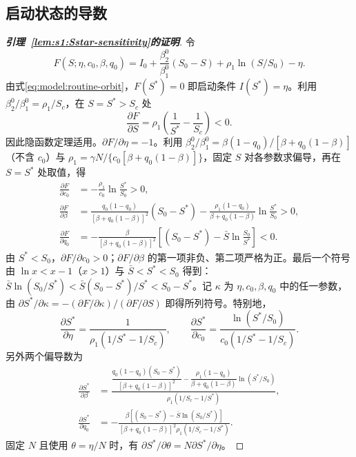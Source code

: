 \subsection{启动状态的导数}
\label{sec:proof:start-sensitivity}
\begin{proof}[\normalfont\bfseries 引理~\ref{lem:s1:Sstar-sensitivity}的证明]
令
\[
F(S;\eta,c_0,\beta,q_0)
=I_0+\frac{\beta_2^0}{\beta_1^0}(S_0-S)+\rho_1\ln(S/S_0)-\eta.
\]
由式\eqref{eq:model:routine-orbit}，$F(S^*)=0$ 即启动条件 $I(S^*)=\eta$。利用 $\beta_2^0/\beta_1^0=\rho_1/S_c$，在 $S=S^*>S_c$ 处
\[
\frac{\partial F}{\partial S}=\rho_1\left(\frac1{S^*}-\frac1{S_c}\right)<0.
\]
因此隐函数定理适用。$\partial F/\partial\eta=-1$。利用 $\beta_2^0/\beta_1^0=\beta(1-q_0)/[\beta+q_0(1-\beta)]$（不含 $c_0$）与 $\rho_1=\gamma N/\{c_0[\beta+q_0(1-\beta)]\}$，固定 $S$ 对各参数求偏导，再在 $S=S^*$ 处取值，得
\begin{align*}
\frac{\partial F}{\partial c_0}
&=-\frac{\rho_1}{c_0}\ln\frac{S^*}{S_0}>0,\\
\frac{\partial F}{\partial\beta}
&=\frac{q_0(1-q_0)}{[\beta+q_0(1-\beta)]^2}(S_0-S^*)
-\frac{\rho_1(1-q_0)}{\beta+q_0(1-\beta)}\ln\frac{S^*}{S_0}>0,\\
\frac{\partial F}{\partial q_0}
&=-\frac{\beta}{[\beta+q_0(1-\beta)]^2}\left[(S_0-S^*)-\bar S\ln\frac{S_0}{S^*}\right]<0.
\end{align*}
由 $S^*<S_0$，$\partial F/\partial c_0>0$；$\partial F/\partial\beta$ 的第一项非负、第二项严格为正。最后一个符号由 $\ln x<x-1$（$x>1$）与 $\bar S<S^*<S_0$ 得到：$\bar S\ln(S_0/S^*)<\bar S(S_0-S^*)/S^*<S_0-S^*$。记 $\kappa$ 为 $\eta,c_0,\beta,q_0$ 中的任一参数，由
$\partial S^*/\partial\kappa=-(\partial F/\partial\kappa)/(\partial F/\partial S)$ 即得所列符号。特别地，
\begin{equation}
\frac{\partial S^*}{\partial\eta}
=\frac1{\rho_1(1/S^*-1/S_c)},\qquad
\frac{\partial S^*}{\partial c_0}
=\frac{\ln(S^*/S_0)}{c_0(1/S^*-1/S_c)}.
\label{eq:s1:Sstar-eta-sign}
\end{equation}
另外两个偏导数为
\begin{align}
\frac{\partial S^*}{\partial\beta}
&=\frac{\dfrac{q_0(1-q_0)(S_0-S^*)}{[\beta+q_0(1-\beta)]^2}
-\dfrac{\rho_1(1-q_0)}{\beta+q_0(1-\beta)}\ln(S^*/S_0)}
{\rho_1(1/S_c-1/S^*)},\label{eq:s1:Sstar-beta-sign}\\
\frac{\partial S^*}{\partial q_0}
&=-\frac{\beta[(S_0-S^*)-\bar S\ln(S_0/S^*)]}
{[\beta+q_0(1-\beta)]^2\rho_1(1/S_c-1/S^*)}.
\label{eq:s1:Sstar-q0-sign}
\end{align}
固定 $N$ 且使用 $\theta=\eta/N$ 时，有 $\partial S^*/\partial\theta=N\partial S^*/\partial\eta$。
\end{proof}

